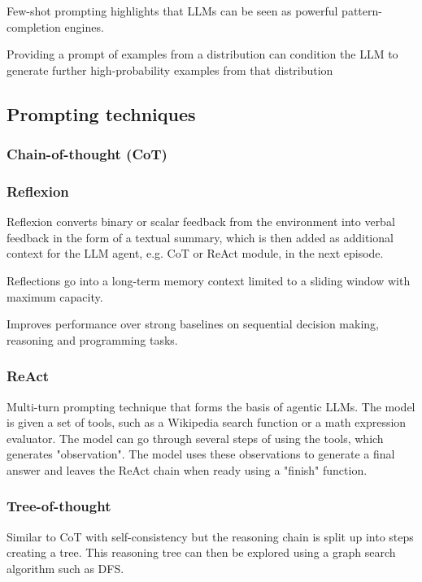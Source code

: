 Few-shot prompting highlights that LLMs can be seen as powerful pattern-completion engines. \cite{meyerson2024languagemodelcrossovervariation}

Providing a prompt of examples from a distribution can condition the LLM to generate further high-probability examples from that distribution \cite{meyerson2024languagemodelcrossovervariation}

\subsection{Prompting techniques}

\subsubsection{Chain-of-thought (CoT)}


\subsubsection{Reflexion}
Reflexion converts binary or scalar feedback from the environment into verbal feedback in the form 
of a textual summary, which is then added as additional context for the LLM agent, e.g. CoT or ReAct module, in the next episode. \cite{shinn2023reflexionlanguageagentsverbal}

Reflections go into a long-term memory context limited to a sliding window with maximum capacity. \cite{shinn2023reflexionlanguageagentsverbal}

Improves performance over strong baselines on sequential decision making, reasoning and programming tasks. \cite{shinn2023reflexionlanguageagentsverbal}
\subsubsection{ReAct}
Multi-turn prompting technique that forms the basis of agentic LLMs. The model is given a set of tools, such as a Wikipedia search function or a math expression evaluator.
The model can go through several steps of using the tools, which generates "observation". The model uses these observations to generate a final answer and leaves the ReAct chain when ready using a "finish" function.
\subsubsection{Tree-of-thought}
Similar to CoT with self-consistency but the reasoning chain is split up into steps creating a tree. This reasoning tree can then be explored using a graph search algorithm such as DFS.
